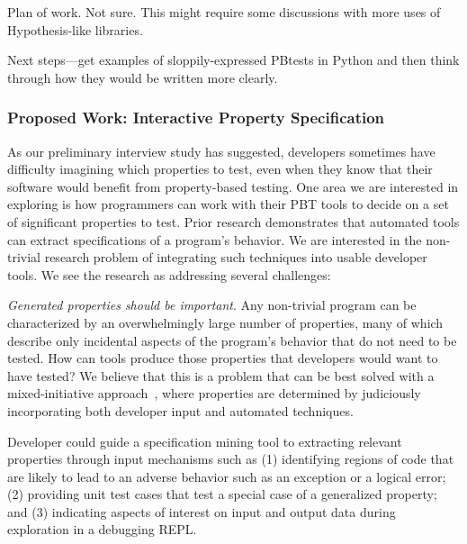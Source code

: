 Plan of work. Not sure. This might require some discussions with more uses of
Hypothesis-like libraries.

Next steps—get examples of sloppily-expressed PBtests in Python and then think
through how they would be written more clearly.

\subsubsection{Proposed Work: Interactive Property Specification}

 

As our preliminary interview study has suggested, developers sometimes have
difficulty imagining which properties to test, even when they know that their
software would benefit from property-based testing. One area we are interested
in exploring is how programmers can work with their PBT tools to decide on a set
of significant properties to test.  Prior research demonstrates that automated
tools can extract specifications of a program's
behavior\cite{ammons2002mining,le2018deep,claessen2010quickspec}. We are
interested in the non-trivial research problem of integrating such techniques
into usable developer tools. We see the research as addressing several
challenges:

\textit{Generated properties should be \emph{important}}. Any non-trivial
program can be characterized by an overwhelmingly large number of properties,
many of which describe only incidental aspects of the program's behavior that do
not need to be tested. How can tools produce those properties that developers
would want to have tested? We believe that this is a problem that can be best
solved with a mixed-initiative approach~\cite{allen1999mixed}, where properties
are determined by judiciously incorporating both developer input and automated
techniques.

Developer could guide a specification mining tool to extracting relevant
properties through input mechanisms such as (1) identifying regions of code that
are likely to lead to an adverse behavior such as an exception or a logical
error; (2) providing unit test cases that test a special case of a generalized
property; and (3) indicating aspects of interest on input and output data during
exploration in a debugging REPL.

